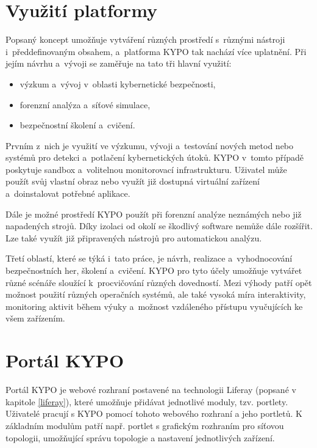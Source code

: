 \documentclass[
  digital, %
  oneside, %
  table,   %
  nolof,     %
  nolot,     %
]{fithesis3}
\begin{document}
\section{Využití platformy}
Popsaný koncept umožňuje vytváření různých prostředí s~různými nástroji i~předdefinovaným obsahem, a~platforma KYPO tak nachází více uplatnění. Při jejím návrhu a~vývoji se zaměřuje na tato tři hlavní využití: \cite{kypo2017}
\begin{itemize}
\item výzkum a~vývoj v~oblasti kybernetické bezpečnosti,
\item forenzní analýza a~síťové simulace,
\item bezpečnostní školení a~cvičení.
\end{itemize}

Prvním z~nich je využití ve výzkumu, vývoji a~testování nových metod nebo systémů pro detekci a~potlačení kybernetických útoků. KYPO v~tomto případě poskytuje sandbox a~volitelnou monitorovací infrastrukturu. Uživatel může použít svůj vlastní obraz nebo využít již dostupná virtuální zařízení a~doinstalovat potřebné aplikace. \cite{kypo2017}\par
Dále je možné prostředí KYPO použít při forenzní analýze neznámých nebo již napadených strojů. Díky izolaci od okolí se škodlivý software nemůže dále rozšířit. Lze také využít již připravených nástrojů pro automatickou analýzu. \cite{lessons2015, kypo2017}\par
Třetí oblastí, které se týká i~tato práce, je návrh, realizace a~vyhodnocování bezpečnostních her, školení a~cvičení. KYPO pro tyto účely umožňuje vytvářet různé scénáře sloužící k~procvičování různých dovedností. Mezi výhody patří opět možnost použití různých operačních systémů, ale také vysoká míra interaktivity, monitoring aktivit během výuky a~možnost vzdáleného přístupu vyučujících ke všem zařízením. \cite{lessons2015, kypocz}

\section{Portál KYPO}
Portál KYPO je webové rozhraní postavené na technologii Liferay (popsané v kapitole \ref{liferay}), které umožňuje přidávat jednotlivé moduly, tzv. portlety. Uživatelé pracují s KYPO pomocí tohoto webového rozhraní a jeho portletů. K základním modulům patří např. portlet s grafickým rozhraním pro síťovou topologii, umožňující správu topologie a nastavení jednotlivých zařízení.
\end{document}
